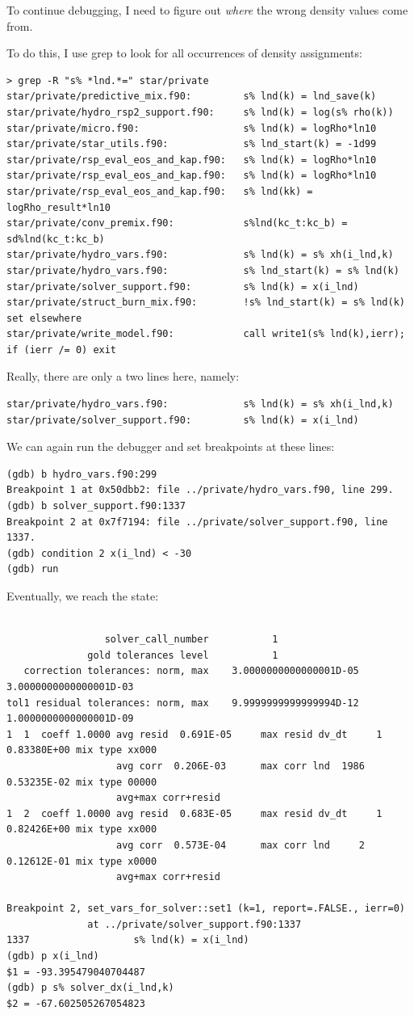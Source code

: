 \documentclass[a4paper,10pt]{article}
\begin{document}
To continue debugging, I need to figure out \emph{where} the wrong density values come from.

To do this, I use grep to look for all occurrences of density assignments:

\begin{verbatim}
> grep -R "s% *lnd.*=" star/private
star/private/predictive_mix.f90:         s% lnd(k) = lnd_save(k)
star/private/hydro_rsp2_support.f90:     s% lnd(k) = log(s% rho(k))
star/private/micro.f90:                  s% lnd(k) = logRho*ln10
star/private/star_utils.f90:             s% lnd_start(k) = -1d99
star/private/rsp_eval_eos_and_kap.f90:   s% lnd(k) = logRho*ln10
star/private/rsp_eval_eos_and_kap.f90:   s% lnd(k) = logRho*ln10
star/private/rsp_eval_eos_and_kap.f90:   s% lnd(kk) = logRho_result*ln10
star/private/conv_premix.f90:            s%lnd(kc_t:kc_b) = sd%lnd(kc_t:kc_b)
star/private/hydro_vars.f90:             s% lnd(k) = s% xh(i_lnd,k)
star/private/hydro_vars.f90:             s% lnd_start(k) = s% lnd(k)
star/private/solver_support.f90:         s% lnd(k) = x(i_lnd)
star/private/struct_burn_mix.f90:        !s% lnd_start(k) = s% lnd(k) set elsewhere
star/private/write_model.f90:            call write1(s% lnd(k),ierr); if (ierr /= 0) exit
\end{verbatim}
Really, there are only a two lines here, namely:
\begin{verbatim}
star/private/hydro_vars.f90:             s% lnd(k) = s% xh(i_lnd,k)
star/private/solver_support.f90:         s% lnd(k) = x(i_lnd)
\end{verbatim}
\nextpage
We can again run the debugger and set breakpoints at these lines:
\begin{verbatim}
(gdb) b hydro_vars.f90:299
Breakpoint 1 at 0x50dbb2: file ../private/hydro_vars.f90, line 299.
(gdb) b solver_support.f90:1337
Breakpoint 2 at 0x7f7194: file ../private/solver_support.f90, line 1337.
(gdb) condition 2 x(i_lnd) < -30
(gdb) run
\end{verbatim}
Eventually, we reach the state:
\begin{verbatim}

                 solver_call_number           1
              gold tolerances level           1
   correction tolerances: norm, max    3.0000000000000001D-05    3.0000000000000001D-03
tol1 residual tolerances: norm, max    9.9999999999999994D-12    1.0000000000000001D-09
1  1  coeff 1.0000 avg resid  0.691E-05     max resid dv_dt     1  0.83380E+00 mix type xx000
                   avg corr  0.206E-03      max corr lnd  1986  0.53235E-02 mix type 00000
                   avg+max corr+resid
1  2  coeff 1.0000 avg resid  0.683E-05     max resid dv_dt     1  0.82426E+00 mix type xx000
                   avg corr  0.573E-04      max corr lnd     2  0.12612E-01 mix type x0000
                   avg+max corr+resid

Breakpoint 2, set_vars_for_solver::set1 (k=1, report=.FALSE., ierr=0) 
              at ../private/solver_support.f90:1337
1337	              s% lnd(k) = x(i_lnd)
(gdb) p x(i_lnd)
$1 = -93.395479040704487
(gdb) p s% solver_dx(i_lnd,k)
$2 = -67.602505267054823
\end{verbatim}
\end{document}
